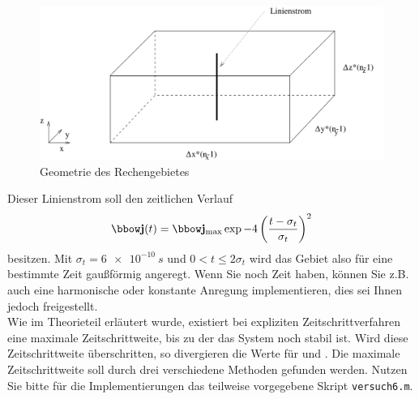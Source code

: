 \documentclass[Protokollheft.tex]{subfiles}
\begin{document}
\begin{figure}[h]
    \centering
    \includegraphics[scale=0.7]{v6_praktskizze.pdf}
    \caption{Geometrie des Rechengebietes}\label{fig:anregung}
\end{figure}

\noindent Dieser Linienstrom soll den zeitlichen Verlauf
\begin{align}
    \jfit(t) = \jfit_{\text{max}} \exp{-4\left(\frac{t-\sigma_t}{\sigma_t}\right)^2}
\end{align}
besitzen. Mit $\sigma_t=\SI{6e-10}{s}$ und $0 < t\leq 2 \sigma_t$ wird das Gebiet also für eine bestimmte Zeit gaußförmig angeregt. Wenn Sie noch Zeit haben, können Sie z.B. auch eine harmonische oder konstante Anregung implementieren, dies sei Ihnen jedoch freigestellt.\\
\noindent
Wie im Theorieteil erläutert wurde, existiert bei expliziten Zeitschrittverfahren eine maximale Zeitschrittweite, bis zu
der das System noch stabil ist. Wird diese Zeitschrittweite
überschritten, so divergieren die Werte für {\efit} und {\hfit}. Die maximale
Zeitschrittweite soll durch drei verschiedene Methoden gefunden werden. Nutzen Sie bitte für die Implementierungen das teilweise vorgegebene Skript \lstinline{versuch6.m}.
\end{document}
